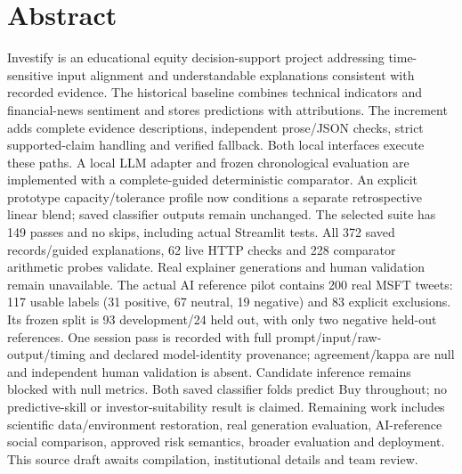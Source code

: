 \chapter*{Abstract}
Investify is an educational equity decision-support project addressing time-sensitive input alignment and understandable explanations consistent with recorded evidence. The historical baseline combines technical indicators and financial-news sentiment and stores predictions with attributions. The increment adds complete evidence descriptions, independent prose/JSON checks, strict supported-claim handling and verified fallback. Both local interfaces execute these paths. A local LLM adapter and frozen chronological evaluation are implemented with a complete-guided deterministic comparator. An explicit prototype capacity/tolerance profile now conditions a separate retrospective linear blend; saved classifier outputs remain unchanged. The selected suite has 149 passes and no skips, including actual Streamlit tests. All 372 saved records/guided explanations, 62 live HTTP checks and 228 comparator arithmetic probes validate. Real explainer generations and human validation remain unavailable. The actual AI reference pilot contains 200 real MSFT tweets: 117 usable labels (31 positive, 67 neutral, 19 negative) and 83 explicit exclusions. Its frozen split is 93 development/24 held out, with only two negative held-out references. One session pass is recorded with full prompt/input/raw-output/timing and declared model-identity provenance; agreement/kappa are null and independent human validation is absent. Candidate inference remains blocked with null metrics. Both saved classifier folds predict Buy throughout; no predictive-skill or investor-suitability result is claimed. Remaining work includes scientific data/environment restoration, real generation evaluation, AI-reference social comparison, approved risk semantics, broader evaluation and deployment. This source draft awaits compilation, institutional details and team review.
